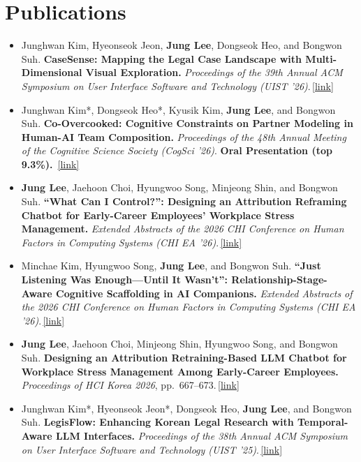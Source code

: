 \documentclass[letterpaper,10pt]{article}
\newcommand{\pub}[1]{\,\href{#1}{\small [link]}}
\let\oldsection\section
\renewcommand{\section}[1]{\needspace{8\baselineskip}\oldsection{#1}}
\newenvironment{plain}
  {\begin{itemize}[leftmargin=1.2em, itemsep=\PLAINSEP, parsep=0pt, topsep=\TOPSEP]}
  {\end{itemize}}
\newcommand{\me}{\textbf{Jung Lee}}   %
\begin{document}
\section{Publications}
\begin{plain}

  \item Junghwan Kim, Hyeonseok Jeon, \me, Dongseok Heo, and Bongwon Suh.
        \textbf{CaseSense: Mapping the Legal Case Landscape with Multi-Dimensional Visual
        Exploration.} \textit{Proceedings of the 39th Annual ACM Symposium on User Interface
        Software and Technology (UIST '26)}.\pub{https://uist.from.so/authors/9669/PpjiLop9__pd}

  \item Junghwan Kim*, Dongseok Heo*, Kyusik Kim, \me, and Bongwon Suh.
        \textbf{Co-Overcooked: Cognitive Constraints on Partner Modeling in Human-AI Team
        Composition.} \textit{Proceedings of the 48th Annual Meeting of the Cognitive Science
        Society (CogSci '26)}. \textbf{Oral Presentation (top 9.3\%).} \pub{https://escholarship.org/uc/item/39n1g8g6}

  \item \me, Jaehoon Choi, Hyungwoo Song, Minjeong Shin, and Bongwon Suh.
        \textbf{``What Can I Control?'': Designing an Attribution Reframing Chatbot for
        Early-Career Employees' Workplace Stress Management.} \textit{Extended Abstracts of the
        2026 CHI Conference on Human Factors in Computing Systems (CHI EA '26)}.\pub{https://dl.acm.org/doi/10.1145/3772363.3798873}

  \item Minchae Kim, Hyungwoo Song, \me, and Bongwon Suh.
        \textbf{``Just Listening Was Enough---Until It Wasn't'': Relationship-Stage-Aware
        Cognitive Scaffolding in AI Companions.} \textit{Extended Abstracts of the 2026 CHI
        Conference on Human Factors in Computing Systems (CHI EA '26)}.\pub{https://dl.acm.org/doi/10.1145/3772363.3798512}

  \item \me, Jaehoon Choi, Minjeong Shin, Hyungwoo Song, and Bongwon Suh.
        \textbf{Designing an Attribution Retraining-Based LLM Chatbot for Workplace Stress
        Management Among Early-Career Employees.} \textit{Proceedings of HCI Korea 2026}, pp.~667--673.\pub{https://www.dbpia.co.kr/journal/articleDetail?nodeId=NODE12745858}

  \item Junghwan Kim*, Hyeonseok Jeon*, Dongseok Heo, \me, and Bongwon Suh.
        \textbf{LegisFlow: Enhancing Korean Legal Research with Temporal-Aware LLM Interfaces.}
        \textit{Proceedings of the 38th Annual ACM Symposium on User Interface Software and
        Technology (UIST '25)}.\pub{https://dl.acm.org/doi/10.1145/3746059.3747752}


\end{plain}
\end{document}
